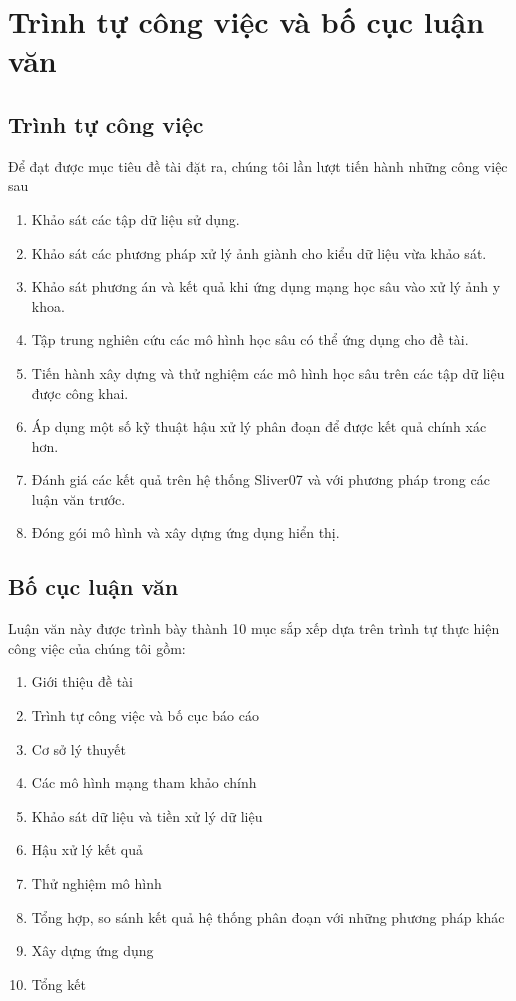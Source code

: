 \chapter{Trình tự công việc và bố cục luận văn}
\section{Trình tự công việc}
Để đạt được mục tiêu đề tài đặt ra, chúng tôi lần lượt tiến hành những công việc sau
\begin{enumerate}
    \item Khảo sát các tập dữ liệu sử dụng.
    \item Khảo sát các phương pháp xử lý ảnh giành cho kiểu dữ liệu vừa khảo sát.
    \item Khảo sát phương án và kết quả khi ứng dụng mạng học sâu vào xử lý ảnh y khoa.
    \item Tập trung nghiên cứu các mô hình học sâu có thể ứng dụng cho đề tài.
    \item Tiến hành xây dựng và thử nghiệm các mô hình học sâu trên các tập dữ liệu được công khai.
    \item Áp dụng một số kỹ thuật hậu xử lý phân đoạn để được kết quả chính xác hơn.
    \item Đánh giá các kết quả trên hệ thống Sliver07 và với phương pháp trong các luận văn trước.
    \item Đóng gói mô hình và xây dựng ứng dụng hiển thị.
\end{enumerate}
\section{Bố cục luận văn}
Luận văn này được trình bày thành 10 mục sắp xếp dựa trên trình tự thực hiện công việc của chúng tôi gồm:
\begin{enumerate}
    \item Giới thiệu đề tài
    \item Trình tự công việc và bố cục báo cáo
    \item Cơ sở lý thuyết
    \item Các mô hình mạng tham khảo chính
    \item Khảo sát dữ liệu và tiền xử lý dữ liệu
    \item Hậu xử lý kết quả
    \item Thử nghiệm mô hình
    \item Tổng hợp, so sánh kết quả hệ thống phân đoạn với những phương pháp khác
    \item Xây dựng ứng dụng
    \item Tổng kết
\end{enumerate}